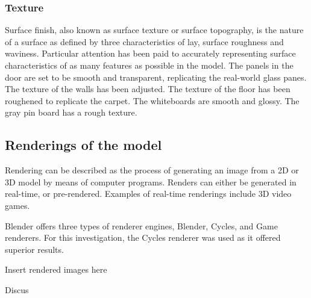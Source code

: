\documentclass[11pt,a4paper]{report}
\begin{document}
				\subsubsection{Texture}
					Surface finish, also known as surface texture or surface topography, is the nature of a surface as defined by three characteristics of lay, surface roughness and waviness.
					\cite{e._paul_degarmo_materials_2003}
					Particular attention has been paid to accurately representing surface characteristics of as many features as possible in the model.
					The panels in the door are set to be smooth and transparent, replicating the real-world glass panes. 
					The texture of the walls has been adjusted.
					The texture of the floor has been roughened to replicate the carpet.
					The whiteboards are smooth and glossy.
					The gray pin board has a rough texture.
			
			\subsection{Renderings of the model}
				Rendering can be described as the process of generating an image from a 2D or 3D model by means of computer programs. Renders can either be generated in real-time, or pre-rendered. Examples of real-time renderings include 3D video games.
				
				Blender offers three types of renderer engines, Blender, Cycles, and Game renderers. For this investigation, the Cycles renderer was used as it offered superior results.
				
				{{Insert rendered images here}} 
				
				Discus 
			

			
\end{document}
